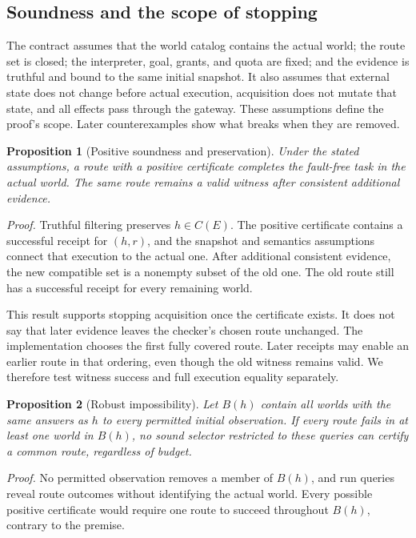 \documentclass[conference]{IEEEtran}
\newtheorem{proposition}{Proposition}
\begin{document}
\subsection{Soundness and the scope of stopping}
The contract assumes that the world catalog contains the actual world; the route set is closed; the interpreter, goal, grants, and quota are fixed; and the evidence is truthful and bound to the same initial snapshot. It also assumes that external state does not change before actual execution, acquisition does not mutate that state, and all effects pass through the gateway. These assumptions define the proof's scope. Later counterexamples show what breaks when they are removed.

\begin{proposition}[Positive soundness and preservation]
Under the stated assumptions, a route with a positive certificate completes the fault-free task in the actual world. The same route remains a valid witness after consistent additional evidence.
\end{proposition}
\emph{Proof.} Truthful filtering preserves $h\in C(E)$. The positive certificate contains a successful receipt for $(h,r)$, and the snapshot and semantics assumptions connect that execution to the actual one. After additional consistent evidence, the new compatible set is a nonempty subset of the old one. The old route still has a successful receipt for every remaining world.

This result supports stopping acquisition once the certificate exists. It does not say that later evidence leaves the checker's chosen route unchanged. The implementation chooses the first fully covered route. Later receipts may enable an earlier route in that ordering, even though the old witness remains valid. We therefore test witness success and full execution equality separately.

\begin{proposition}[Robust impossibility]
Let $B(h)$ contain all worlds with the same answers as $h$ to every permitted initial observation. If every route fails in at least one world in $B(h)$, no sound selector restricted to these queries can certify a common route, regardless of budget.
\end{proposition}
\emph{Proof.} No permitted observation removes a member of $B(h)$, and run queries reveal route outcomes without identifying the actual world. Every possible positive certificate would require one route to succeed throughout $B(h)$, contrary to the premise.
\end{document}
